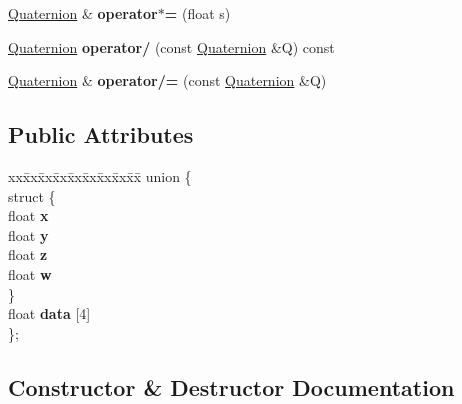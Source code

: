 \begin{DoxyCompactItemize}
\hyperlink{classdrider_s_d_k_1_1_quaternion}{Quaternion} \& {\bfseries operator$\ast$=} (float s)
\item 
\mbox{\label{classdrider_s_d_k_1_1_quaternion_a2bcae404a0cb030490b618f19140adf5}} 
\hyperlink{classdrider_s_d_k_1_1_quaternion}{Quaternion} {\bfseries operator/} (const \hyperlink{classdrider_s_d_k_1_1_quaternion}{Quaternion} \&Q) const
\item 
\mbox{\label{classdrider_s_d_k_1_1_quaternion_a67e8465383eed2f429ddce83a07a8d7d}} 
\hyperlink{classdrider_s_d_k_1_1_quaternion}{Quaternion} \& {\bfseries operator/=} (const \hyperlink{classdrider_s_d_k_1_1_quaternion}{Quaternion} \&Q)
\end{DoxyCompactItemize}
\subsection*{Public Attributes}
\begin{DoxyCompactItemize}
\item 
\mbox{\label{classdrider_s_d_k_1_1_quaternion_a5ef3bca21e0b6e3e475108eb93ab1e40}} 
\begin{tabbing}
xx\=xx\=xx\=xx\=xx\=xx\=xx\=xx\=xx\=\kill
union \{\\
\mbox{\label{uniondrider_s_d_k_1_1_quaternion_1_1_0D8_a1e032a7dbbf531b64519917ee2968ec7}} 
\>struct \{\\
\>\>float {\bfseries x}\\
\>\>float {\bfseries y}\\
\>\>float {\bfseries z}\\
\>\>float {\bfseries w}\\
\>\} \\
\>float {\bfseries data} \mbox{[}4\mbox{]}\\
\}; \\

\end{tabbing}\end{DoxyCompactItemize}


\subsection{Constructor \& Destructor Documentation}
\mbox{\label{classdrider_s_d_k_1_1_quaternion_ae022b897e4f962cf3a7f5a155ad01234}} 
